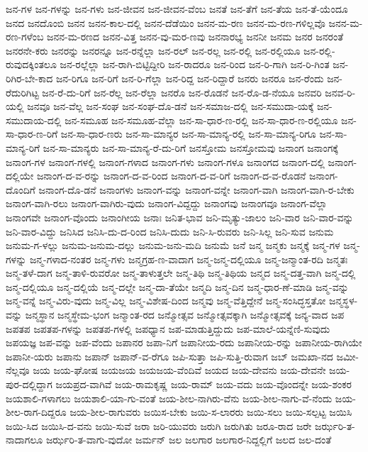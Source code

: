 {ಜನ-ಗಳ
ಜನ-ಗಳನ್ನು
ಜನ-ಗಳು
ಜನ-ಜೀವನ
ಜನ-ಜೀವನ-ವೆಂಬ
ಜನತೆ
ಜನ-ತೆಗೆ
ಜನ-ತೆಯ
ಜನ-ತೆ-ಯೆಂದೂ
ಜನದ
ಜನದೊಂಬಿ
ಜನನ
ಜನನ-ಕಾಲ-ದಲ್ಲಿ
ಜನನ-ದೆಡೆಯಿಂ
ಜನನ-ಮ-ರಣ
ಜನನ-ಮ-ರಣ-ಗಳಿಲ್ಲವೊ
ಜನನ-ಮ-ರಣ-ಗಳೆಂಬ
ಜನನ-ಮ-ರಣದ
ಜನನ-ವಿತ್ತ
ಜನನ-ವು-ಮರ-ಣವು
ಜನನಾರಭ್ಯ
ಜನನೀ
ಜನಮ
ಜನರ
ಜನರಂತೆ
ಜನರನೇ-ಕರು
ಜನರನ್ನು
ಜನರನ್ನೂ
ಜನ-ರನ್ನೆಲ್ಲಾ
ಜನ-ರಲ್
ಜನ-ರಲ್ಲ
ಜನ-ರಲ್ಲಿ
ಜನ-ರಲ್ಲಿಯೂ
ಜನ-ರಲ್ಲಿ-ರುವುದಕ್ಕಿಂತಲೂ
ಜನ-ರಲ್ಲೆಲ್ಲಾ
ಜನ-ರಾಗಿ-ಬಿಟ್ಟಿದ್ದೀರಿ
ಜನ-ರಾದರೂ
ಜನ-ರಿಂದ
ಜನ-ರಿ-ಗಾಗಿ
ಜನ-ರಿ-ಗಿಂತ
ಜನ-ರಿಗಿರ-ಬೇ-ಕಾದ
ಜನ-ರಿಗೂ
ಜನ-ರಿಗೆ
ಜನ-ರಿ-ಗೆಲ್ಲಾ
ಜನ-ರಿದ್ದ
ಜನ-ರಿದ್ದಾರೆ
ಜನರು
ಜನರೂ
ಜನ-ರೆಂದು
ಜನ-ರೆದುರಿಗಿಟ್ಟ
ಜನ-ರೆ-ದು-ರಿಗೆ
ಜನ-ರೆಲ್ಲ
ಜನ-ರೆಲ್ಲಾ
ಜನರೊ
ಜನ-ರೊಡನೆ
ಜನ-ರೊ-ಡ-ನೆಯೂ
ಜನವರಿ
ಜನವ-ರಿ-ಯಲ್ಲಿ
ಜನವೂ
ಜನ-ವೆಲ್ಲ
ಜನ-ಸಂಘ
ಜನ-ಸಂಘ-ದೊ-ಡನೆ
ಜನ-ಸಮಾಜ-ದಲ್ಲಿ
ಜನ-ಸಮುದಾ-ಯಕ್ಕೆ
ಜನ-ಸಮುದಾಯ-ದಲ್ಲಿ
ಜನ-ಸಮೂಹ
ಜನ-ಸಮೂಹ-ವೆಲ್ಲಾ
ಜನ-ಸಾ-ಧಾರ-ಣ-ರಲ್ಲಿ
ಜನ-ಸಾ-ಧಾರ-ಣ-ರಲ್ಲಿಯೂ
ಜನ-ಸಾ-ಧಾರ-ಣ-ರಿಗೆ
ಜನ-ಸಾ-ಧಾರ-ಣರು
ಜನ-ಸಾ-ಮಾನ್ಯರ
ಜನ-ಸಾ-ಮಾನ್ಯ-ರಲ್ಲಿ
ಜನ-ಸಾ-ಮಾನ್ಯ-ರಿಗೂ
ಜನ-ಸಾ-ಮಾನ್ಯ-ರಿಗೆ
ಜನ-ಸಾ-ಮಾನ್ಯರು
ಜನ-ಸಾ-ಮಾನ್ಯ-ರೆ-ದು-ರಿಗೆ
ಜನಸ್ತೋಮ
ಜನಸ್ತೋಮವು
ಜನಾಂಗ
ಜನಾಂಗಕ್ಕೆ
ಜನಾಂಗ-ಗಳ
ಜನಾಂಗ-ಗಳಲ್ಲಿ
ಜನಾಂಗ-ಗಳಾದ
ಜನಾಂಗ-ಗಳು
ಜನಾಂಗ-ಗಳೂ
ಜನಾಂಗದ
ಜನಾಂಗ-ದಲ್ಲಿ
ಜನಾಂಗ-ದಲ್ಲಿಯೇ
ಜನಾಂಗ-ದ-ವ-ರನ್ನು
ಜನಾಂಗ-ದ-ವ-ರಿಂದ
ಜನಾಂಗ-ದ-ವ-ರಿಗೆ
ಜನಾಂಗ-ದ-ವ-ರೊಡನೆ
ಜನಾಂಗ-ದೊಂದಿಗೆ
ಜನಾಂಗ-ದೊ-ಡನೆ
ಜನಾಂಗಳು
ಜನಾಂಗ-ವನ್ನು
ಜನಾಂಗ-ವನ್ನೇ
ಜನಾಂಗ-ವಾಗಿ
ಜನಾಂಗ-ವಾಗಿ-ರ-ಬೇಕು
ಜನಾಂಗ-ವಾಗಿ-ರಲು
ಜನಾಂಗ-ವಾಗಿರು-ವುದು
ಜನಾಂಗ-ವಿದ್ದದ್ದು
ಜನಾಂಗವು
ಜನಾಂಗವೂ
ಜನಾಂಗ-ವೆಲ್ಲಾ
ಜನಾಂಗವೇ
ಜನಾಂಗ-ವೊಂದು
ಜನಾಂಗೀಯ
ಜನಾಃ
ಜನಿತ-ಭಾವ
ಜನಿ-ಮೃತ್ಯು-ಜಾಲಂ
ಜನಿ-ವಾರ
ಜನಿ-ವಾರ-ವನ್ನು
ಜನಿ-ವಾರ-ವಿದ್ದು
ಜನಿಸಿದ
ಜನಿಸಿ-ದು-ದ-ರಿಂದ
ಜನಿಸಿ-ದುದು
ಜನಿ-ಸಿ-ರುವರು
ಜನಿ-ಸಿಲ್ಲ
ಜನಿ-ಸುವ
ಜನುಮ
ಜನುಮ-ಗ-ಳಲ್ಲು
ಜನುಮ-ಜನುಮ-ದಲ್ಲು
ಜನುಮ-ಜನು-ಮದಿ
ಜನುಮೆ
ಜನೆ
ಜನ್ಮ
ಜನ್ಮಕು
ಜನ್ಮಕ್ಕೆ
ಜನ್ಮ-ಗಳ
ಜನ್ಮ-ಗಳನ್ನು
ಜನ್ಮ-ಗಳಾದ-ನಂತರ
ಜನ್ಮ-ಗಳು
ಜನ್ಮಗ್ರಹ-ಣ-ವಾದಾಗ
ಜನ್ಮ-ಜನ್ಮ-ದಲ್ಲಿಯೂ
ಜನ್ಮ-ಜನ್ಮಾಂತ-ರದಿ
ಜನ್ಮತಃ
ಜನ್ಮ-ತಳೆ-ದಾಗ
ಜನ್ಮ-ತಾಳಿ-ರುವರೋ
ಜನ್ಮ-ತಾಳುತ್ತಲೇ
ಜನ್ಮ-ತಿಥಿ
ಜನ್ಮ-ತಿಥಿಯ
ಜನ್ಮದ
ಜನ್ಮ-ದತ್ತ-ವಾಗಿ
ಜನ್ಮ-ದಲ್ಲಿ
ಜನ್ಮ-ದಲ್ಲಿಯೂ
ಜನ್ಮ-ದಲ್ಲಿಯೆ
ಜನ್ಮ-ದಲ್ಲೇ
ಜನ್ಮ-ದಾ-ತೆಯೇ
ಜನ್ಮದಿ
ಜನ್ಮ-ದಿನ
ಜನ್ಮ-ಧಾರ-ಣೆ-ಮಾಡಿ
ಜನ್ಮ-ವನ್ನು
ಜನ್ಮ-ವನ್ನೆ
ಜನ್ಮ-ವಿರು-ವುದು
ಜನ್ಮ-ವಿಲ್ಲ
ಜನ್ಮ-ವಿಶೇಷ-ದಿಂದ
ಜನ್ಮವು
ಜನ್ಮ-ವೆತ್ತಿದ್ದೇನೆ
ಜನ್ಮ-ಸಂಸಿದ್ಧಸ್ತತೋ
ಜನ್ಮಸ್ಥಳ-ವನ್ನು
ಜನ್ಮಸ್ಥಾನ
ಜನ್ಮಸ್ಥೇಮ-ಭಂಗ
ಜನ್ಮಾಂತ-ರದ
ಜನ್ಮೋತ್ಸವ
ಜನ್ಮೋತ್ಸವಕ್ಕಾಗಿ
ಜನ್ಮೋತ್ಸವಕ್ಕೆ
ಜನ್ಯ-ವಾದ
ಜಪ
ಜಪತಪ
ಜಪತಪ-ಗಳನ್ನು
ಜಪತಪ-ಗಳಲ್ಲಿ
ಜಪಧ್ಯಾನ
ಜಪ-ಮಾಡುತ್ತಿದ್ದುದು
ಜಪ-ಮಾಲೆ-ಯನ್ನೆಣಿ-ಸುವುದು
ಜಪಯಜ್ಞ
ಜಪ-ವನ್ನು
ಜಪ-ವೆಂದು
ಜಪಾನರ
ಜಪಾ-ನಿಗೆ
ಜಪಾನೀಯ-ರದು
ಜಪಾನೀಯ-ರನ್ನು
ಜಪಾನೀಯ-ರಾಗಿಯೇ
ಜಪಾನೀ-ಯರು
ಜಪಾನು
ಜಪಾನ್
ಜಪಾನ್-ವ-ರೆಗೂ
ಜಪಿ-ಸುತ್ತಾ
ಜಪಿ-ಸುತ್ತಿ-ರುವಾಗ
ಜಬ್
ಜಮಖಾ-ನದ
ಜಮೀ-ನೆಲ್ಲವೂ
ಜಯ
ಜಯ-ಘೋಷ
ಜಯಜಯ
ಜಯಜಯ-ವೆಂದಿವೆ
ಜಯದ
ಜಯ-ದೇವನು
ಜಯ-ದೇವನೇ
ಜಯ-ಪುರ-ದಲ್ಲಿದ್ದಾಗ
ಜಯಪ್ರದ-ವಾಗಿವೆ
ಜಯ-ರಾಮಕೃಷ್ಣ
ಜಯ-ರಾಮ್
ಜಯ-ವದು
ಜಯ-ವೊಂದನ್ನೇ
ಜಯ-ಶಂಕರ
ಜಯಶಾಲಿ-ಗಳಾಗಲು
ಜಯಶಾಲಿ-ಯಾ-ಗು-ವಂತೆ
ಜಯ-ಶೀಲ-ನಾಗಿರು-ವೆನು
ಜಯ-ಶೀಲ-ನಾಗು-ವೆ-ನೆಂದು
ಜಯ-ಶೀಲ-ರಾಗ-ದಿದ್ದರೂ
ಜಯ-ಶೀಲ-ರಾಗುವರು
ಜಯಿಸ-ಬೇಕು
ಜಯಿ-ಸ-ಲಾರರು
ಜಯಿ-ಸಲು
ಜಯಿ-ಸಲ್ಪಟ್ಟ
ಜಯಿಸಿ
ಜಯಿ-ಸಿದ
ಜಯಿಸಿ-ದ-ವನು
ಜಯಿ-ಸುವೆ
ಜರಾ
ಜರಿ-ಯುವರು
ಜರುಗಿ
ಜರುಗಿತು
ಜರೂ-ರಾದ
ಜರೇ
ಜರ್ಝರಿ-ತ-ನಾದಾಗಲೂ
ಜರ್ಝರಿ-ತ-ವಾಗು-ವುದೋ
ಜರ್ಮನ್
ಜಲ
ಜಲಗಾರ
ಜಲಗಾರ-ನಿದ್ದಲ್ಲಿಗೆ
ಜಲದ
ಜಲ-ದಂತೆ
}

